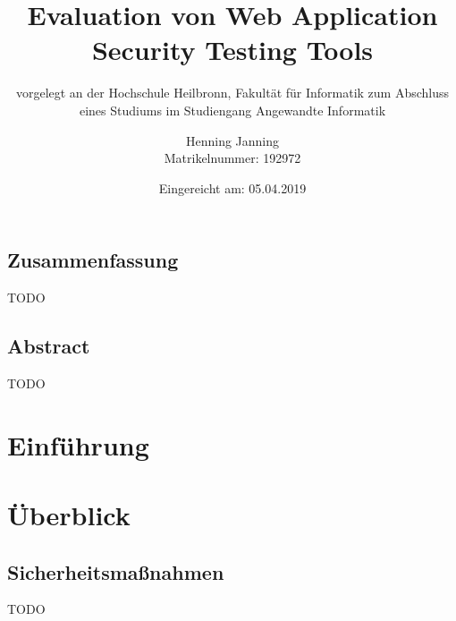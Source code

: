 \documentclass[12pt,oneside,a4paper,parskip]{scrbook}
\def\BaAuthor{Henning Janning}
\def\BaTitle{Evaluation von Web Application Security Testing Tools}
\def\BaSupervisorOne{Prof. Andreas Mayer}
\def\BaSupervisorTwo{Susanne Steuer (M.Sc.) }
\def\BaDeadline{05.04.2019}
\def\MatNr{192972}
\begin{document}



\frontmatter
\titlehead{%
  {Hochschule Heilbronn\\
   Fakultät für Informatik}}
\subject{Bachelorarbeit}
\title{\BaTitle\\[15mm]}
\subtitle{\normalsize{vorgelegt an der Hochschule Heilbronn, Fakultät für Informatik zum Abschluss eines Studiums im Studiengang Angewandte Informatik}}
\author{\BaAuthor\\
\normalsize{Matrikelnummer: \MatNr}}
\date{\normalsize{Eingereicht am: \BaDeadline}}
\publishers{
  \normalsize{Erstpr\"{u}fer: \BaSupervisorOne}\\
  \normalsize{Zweitpr\"{u}ferin: \BaSupervisorTwo}\\
}


\maketitle



\section*{Zusammenfassung}

TODO

\section*{Abstract}

TODO


\setcounter{secnumdepth}{3}
\setcounter{tocdepth}{3}
\tableofcontents


\mainmatter

\chapter{Einführung}\label{ch:intro}

\chapter{Überblick}

\section{Sicherheitsmaßnahmen}
TODO
\end{document}
